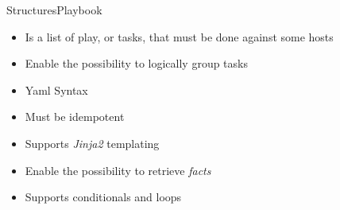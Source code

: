 \documentclass[10pt]{beamer}
\begin{document}
\begin{frame}[fragile]{Structures}{Playbook}

\begin{itemize}
    \item Is a list of play, or tasks, that must be done against some hosts
    \item Enable the possibility to logically group tasks
    \item Yaml Syntax
    \item Must be idempotent
    \item Supports \textit{Jinja2} templating
    \item Enable the possibility to retrieve \textit{facts}
    \item Supports conditionals and loops
\end{itemize}
\end{frame}
\end{document}
